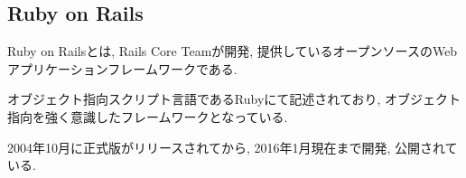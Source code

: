 \subsection{Ruby on Rails}
Ruby on Railsとは, Rails Core Teamが開発, 提供しているオープンソースのWebアプリケーションフレームワークである.

オブジェクト指向スクリプト言語であるRubyにて記述されており, オブジェクト指向を強く意識したフレームワークとなっている.

2004年10月に正式版がリリースされてから, 2016年1月現在まで開発, 公開されている.

